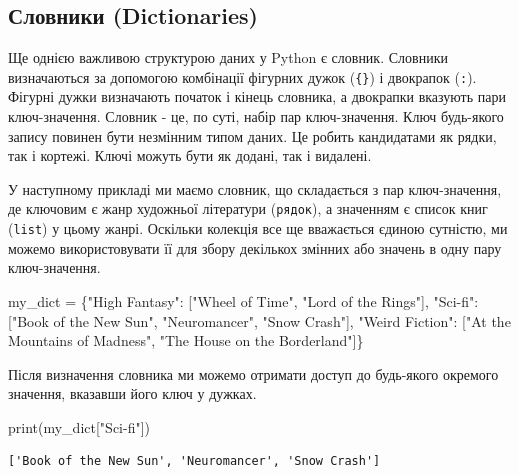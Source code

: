 \documentclass[
  letterpaper,
]{report}
\newenvironment{Shaded}{\begin{snugshade}}{\end{snugshade}}
\newcommand{\BuiltInTok}[1]{\textcolor[rgb]{0.00,0.23,0.31}{#1}}
\newcommand{\NormalTok}[1]{\textcolor[rgb]{0.00,0.23,0.31}{#1}}
\newcommand{\OperatorTok}[1]{\textcolor[rgb]{0.37,0.37,0.37}{#1}}
\newcommand{\StringTok}[1]{\textcolor[rgb]{0.13,0.47,0.30}{#1}}
\begin{document}
\hypertarget{ux441ux43bux43eux432ux43dux438ux43aux438-dictionaries}{%
\subsection{Словники
(Dictionaries)}\label{ux441ux43bux43eux432ux43dux438ux43aux438-dictionaries}}

Ще однією важливою структурою даних у Python є словник. Словники
визначаються за допомогою комбінації фігурних дужок (\texttt{\{\}}) і
двокрапок (\texttt{:}). Фігурні дужки визначають початок і кінець
словника, а двокрапки вказують пари ключ-значення. Словник - це, по
суті, набір пар ключ-значення. Ключ будь-якого запису повинен бути
незмінним типом даних. Це робить кандидатами як рядки, так і кортежі.
Ключі можуть бути як додані, так і видалені.

У наступному прикладі ми маємо словник, що складається з пар
ключ-значення, де ключовим є жанр художньої літератури (\texttt{рядок}),
а значенням є список книг (\texttt{list}) у цьому жанрі. Оскільки
колекція все ще вважається єдиною сутністю, ми можемо використовувати її
для збору декількох змінних або значень в одну пару ключ-значення.

\begin{Shaded}
\begin{Highlighting}[]
\NormalTok{my\_dict }\OperatorTok{=}\NormalTok{ \{}\StringTok{"High Fantasy"}\NormalTok{: [}\StringTok{"Wheel of Time"}\NormalTok{, }\StringTok{"Lord of the Rings"}\NormalTok{],}
           \StringTok{"Sci{-}fi"}\NormalTok{: [}\StringTok{"Book of the New Sun"}\NormalTok{, }\StringTok{"Neuromancer"}\NormalTok{, }\StringTok{"Snow Crash"}\NormalTok{],}
           \StringTok{"Weird Fiction"}\NormalTok{: [}\StringTok{"At the Mountains of Madness"}\NormalTok{, }\StringTok{"The House on the Borderland"}\NormalTok{]\}}
\end{Highlighting}
\end{Shaded}

Після визначення словника ми можемо отримати доступ до будь-якого
окремого значення, вказавши його ключ у дужках.

\begin{Shaded}
\begin{Highlighting}[]
\BuiltInTok{print}\NormalTok{(my\_dict[}\StringTok{"Sci{-}fi"}\NormalTok{])}
\end{Highlighting}
\end{Shaded}

\begin{verbatim}
['Book of the New Sun', 'Neuromancer', 'Snow Crash']
\end{verbatim}
\end{document}
